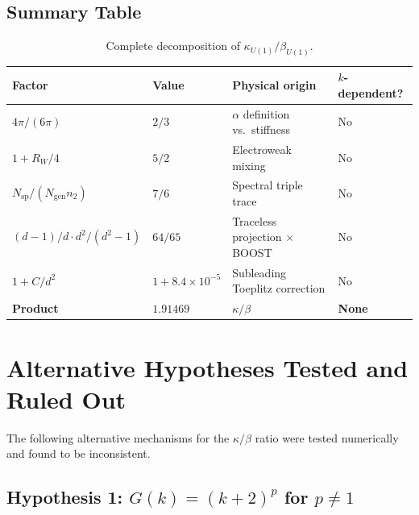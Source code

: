 \documentclass[12pt,a4paper]{article}
\theoremstyle{definition}
\theoremstyle{remark}
\begin{document}
\subsection{Summary Table}

\begin{table}[h]
\centering
\caption{Complete decomposition of $\kappa_{U(1)}/\beta_{U(1)}$.}
\label{tab:decomposition}
\renewcommand{\arraystretch}{1.4}
\begin{tabular}{llll}
\toprule
\textbf{Factor} & \textbf{Value} & \textbf{Physical origin}
  & \textbf{$k$-dependent?} \\
\midrule
$4\pi/(6\pi)$ & $2/3$ & $\alpha$ definition vs.\ stiffness & No \\
$1 + R_W/4$ & $5/2$ & Electroweak mixing & No \\
$N_{\mathrm{sp}}/(N_{\mathrm{gen}} n_2)$ & $7/6$
  & Spectral triple trace & No \\
$(d{-}1)/d \cdot d^2/(d^2{-}1)$ & $64/65$
  & Traceless projection $\times$ BOOST & No \\
$1 + C/d^2$ & $1 + 8.4 \times 10^{-5}$
  & Subleading Toeplitz correction & No \\
\midrule
\textbf{Product} & $\mathbf{1.91469}$ & $\kappa/\beta$ & \textbf{None} \\
\bottomrule
\end{tabular}
\end{table}

\section{Alternative Hypotheses Tested and Ruled Out}
\label{sec:alternatives}

The following alternative mechanisms for the $\kappa/\beta$ ratio
were tested numerically and found to be inconsistent.

\subsection{Hypothesis 1: $G(k) = (k+2)^p$ for $p \neq 1$}
\end{document}
